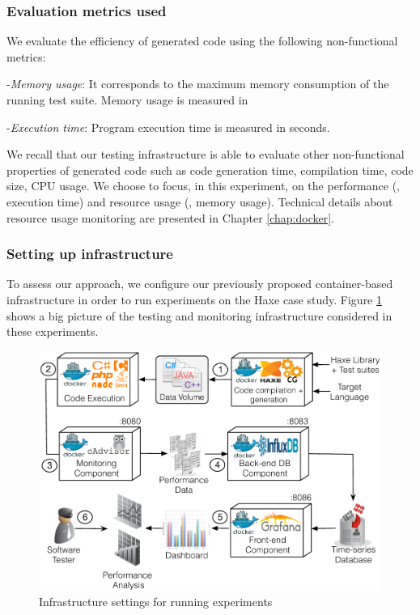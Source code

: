 \subsubsection{Evaluation metrics used}
We evaluate the efficiency of generated code using the following non-functional metrics:

-\textit{Memory usage}:
It corresponds to the maximum memory consumption of the running test suite. Memory usage is measured in \SI{}{\mega\byte}

-\textit{Execution time}:
Program execution time is measured in seconds.

We recall that our testing infrastructure is able to evaluate other non-functional properties of generated code such as code generation time, compilation time, code size, CPU usage. We choose to focus, in this experiment, on the performance (\ie, execution time) and resource usage (\ie, memory usage). Technical details about resource usage monitoring are presented in Chapter \ref{chap:docker}. 

\subsubsection{Setting up infrastructure}

To assess our approach, we configure our previously proposed container-based infrastructure in order to run experiments on the Haxe case study.
Figure \ref{fig:settingup.pdf} shows a big picture of the testing and monitoring infrastructure considered in these experiments.

\begin{figure}[h]
	\centering
	\includegraphics[width=0.8\linewidth]{chapitre4/fig/settingup.pdf}
	\caption{Infrastructure settings for running experiments}
	\label{fig:settingup.pdf}
\end{figure}

